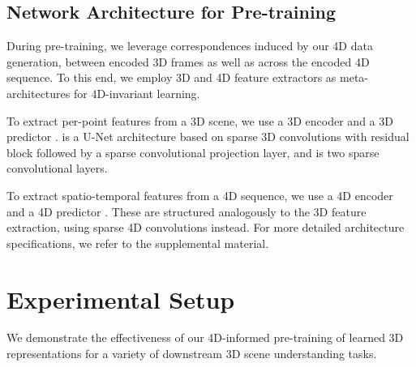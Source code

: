 \documentclass[runningheads]{llncs}
\begin{document}
\subsection{Network Architecture for Pre-training}
During pre-training, we leverage correspondences induced by our 4D data generation, between encoded 3D frames as well as across the encoded 4D sequence.
To this end, we employ 3D and 4D feature extractors as meta-architectures for 4D-invariant learning.

To extract per-point features from a 3D scene, we use a 3D encoder  and a 3D predictor . 
 is a U-Net architecture based on sparse 3D convolutions with residual block followed by a  sparse convolutional projection layer, and   is two  sparse convolutional layers.

To extract spatio-temporal features from a 4D sequence, we use a 4D encoder  and a 4D predictor . 
These are structured analogously to the 3D feature extraction, using sparse 4D convolutions instead.
For more detailed architecture specifications, we refer to the supplemental material.

 
\section{Experimental Setup}
\label{sec:exp_setup}
We demonstrate the effectiveness of our 4D-informed pre-training of learned 3D representations for a variety of downstream 3D scene understanding tasks.
\end{document}
